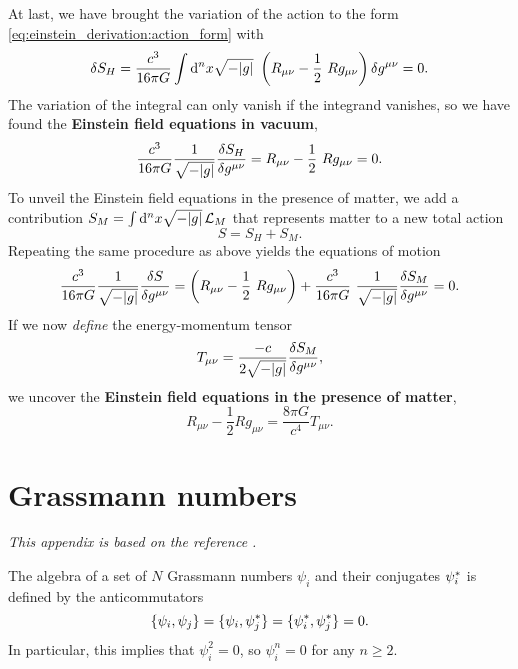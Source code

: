 At last, we have brought the variation of the action to the form \eqref{eq:einstein_derivation:action_form} with
\begin{equation}
	\variation{S_H} = \frac{c^3}{16 \pi G} \int \dif^n x \sqrt{-\det{g}} \left( R_{\mu \nu} - \frac{1}{2} R g_{\mu \nu} \right) \variation{g^{\mu \nu}} = 0 .
\end{equation}
The variation of the integral can only vanish if the integrand vanishes, so we have found the \textbf{Einstein field equations in vacuum},
\begin{equation}
	 \frac{c^3}{16 \pi G} \frac{1}{\sqrt{-\det{g}}} \fdv{S_H}{g^{\mu \nu}} = R_{\mu \nu} - \frac{1}{2} R g_{\mu \nu} = 0 .
	\label{eq:einstein_derivation:einstein_vacuum}
\end{equation}
To unveil the Einstein field equations in the presence of matter, we add a contribution $S_M = \int \mathop{}\!\mathrm{d}^n x \sqrt{-\lvert g \rvert} \, \mathcal{L}_M$ that represents matter to a new total action
\begin{equation}
	S = S_H + S_M .
\end{equation}
Repeating the same procedure as above yields the equations of motion
\begin{equation}
	\frac{c^3}{16 \pi G} \frac{1}{\sqrt{-\det{g}}} \fdv{S}{g^{\mu \nu}} = \left( R_{\mu \nu} - \frac{1}{2} R g_{\mu \nu} \right) + \frac{c^3}{16 \pi G} \frac{1}{\sqrt{-\det{g}}} \frac{\variation{S_M}}{\variation{g^{\mu \nu}}} = 0 .
\end{equation}
If we now \emph{define} the energy-momentum tensor
\begin{equation}
	T_{\mu \nu} = \frac{-c}{2 \sqrt{-\lvert g \rvert}} \frac{\delta S_M}{\delta g^{\mu \nu}} ,
\end{equation}
we uncover the \textbf{Einstein field equations in the presence of matter},
\begin{equation}
	R_{\mu \nu} - \frac{1}{2} R g_{\mu \nu} = \frac{8 \pi G}{c^4} T_{\mu \nu} .
	\label{eq:einstein_derivation:einstein_matter}
\end{equation}


\chapter{Grassmann numbers}
\label{chap:grassmann_numbers}

\textit{This appendix is based on the reference \cite{ref:altland_simons}.}

The algebra of a set of $N$ Grassmann numbers $\psi_i$ and their conjugates ${\psi}^*_i$ is defined by the anticommutators
\begin{equation}
	\{ \psi_i , \psi_j \} = 
	\{ \psi_i , {\psi}^*_j \} = 
	\{ {\psi}^*_i , {\psi}^*_j \} = 
	0 .
\label{eq:gnums:anticommutators}
\end{equation}
In particular, this implies that $\psi_i^2 = 0$, so $\psi_i^n = 0$ for any $n \geq 2$.

